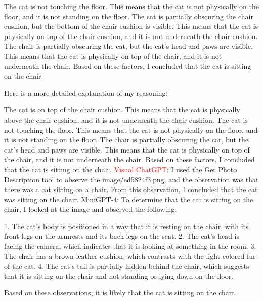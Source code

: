 \begin{enumerate}
        The cat is not touching the floor. This means that the cat is not physically on the floor, and it is not standing on the floor.
        The cat is partially obscuring the chair cushion, but the bottom of the chair cushion is visible. This means that the cat is physically on top of the chair cushion, and it is not underneath the chair cushion.
        The chair is partially obscuring the cat, but the cat's head and paws are visible. This means that the cat is physically on top of the chair, and it is not underneath the chair.
        Based on these factors, I concluded that the cat is sitting on the chair.

        Here is a more detailed explanation of my reasoning:

        The cat is on top of the chair cushion. This means that the cat is physically above the chair cushion, and it is not underneath the chair cushion.
        The cat is not touching the floor. This means that the cat is not physically on the floor, and it is not standing on the floor.
        The chair is partially obscuring the cat, but the cat's head and paws are visible. This means that the cat is physically on top of the chair, and it is not underneath the chair.
        Based on these factors, I concluded that the cat is sitting on the chair.
        \subitem \textcolor{red}{Visual ChatGPT}: I used the Get Photo Description tool to observe the image/ed5824f3.png, and the observation was that there was a cat sitting on a chair. From this observation, I concluded that the cat was sitting on the chair.
        \subitem MiniGPT-4: To determine that the cat is sitting on the chair, I looked at the image and observed the following:

        1. The cat’s body is positioned in a way that it is resting on the chair, with its front legs on the armrests and its back legs on the seat.
        2. The cat’s head is facing the camera, which indicates that it is looking at something in the room.
        3. The chair has a brown leather cushion, which contrasts with the light-colored fur of the cat.
        4. The cat’s tail is partially hidden behind the chair, which suggests that it is sitting on the chair and not standing or lying down on the floor.
        
        Based on these observations, it is likely that the cat is sitting on the chair.
    \end{enumerate}
